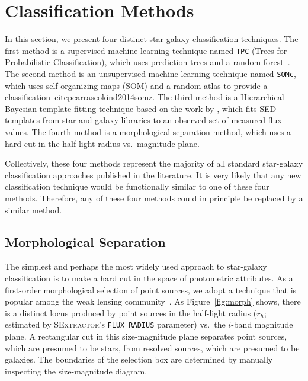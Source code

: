 \documentclass[useAMS,usenatbib]{mn2e}
\begin{document}
\section{Classification Methods}
  \label{section:classification_methods}

In this section, we present
four distinct star-galaxy classification techniques.
The first method is
a supervised machine learning technique named \texttt{TPC}
(Trees for Probabilistic Classification),
which uses prediction trees and a random forest~\citep{carrascokind2013tpz}.
The second method is
an unsupervised machine learning technique named \texttt{SOMc},
which uses self-organizing maps (SOM) and a random atlas
to provide a classification~citep{carrascokind2014somz}.
The third method is
a Hierarchical Bayesian template fitting technique
based on the work by \cite{Fadely2012},
which fits SED templates from star and galaxy libraries
to an observed set of measured flux values.
The fourth method is a morphological separation method,
which uses a hard cut in the half-light radius vs.\ magnitude plane.

Collectively, these four methods represent the majority of all
standard star-galaxy classification approaches published in the literature.
It is very likely that any new classification technique would be
functionally similar to one of these four   methods.
Therefore, any of these four methods could in principle be replaced by a similar method. 


\subsection{Morphological Separation}

The simplest and perhaps the most widely used approach
to star-galaxy classification is
to make a hard cut in the space of photometric attributes.
As a first-order morphological selection of point sources,
we adopt a technique that is popular among the weak lensing 
community~\citep{Kaiser1995}.
As Figure~\ref{fig:morph} shows, there is a distinct locus
produced by point sources in the half-light radius
($r_h$; estimated by \textsc{SExtractor}'s \texttt{FLUX\_RADIUS} parameter)
vs.\ the $i$-band magnitude plane.
A rectangular cut in this size-magnitude plane separates point sources,
which are presumed to be stars,
from resolved sources,
which are presumed to be galaxies.
The boundaries of the selection box are determined by
manually inspecting the size-magnitude diagram.
\end{document}
